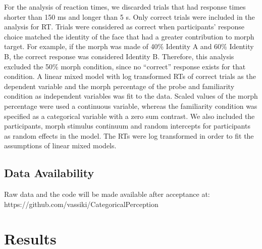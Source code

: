 \documentclass[10pt,letterpaper]{article}
\begin{document}
For the analysis of reaction times, we discarded trials that had response times shorter than 150 ms and longer than 5 s. Only correct trials were included in the analysis for RT. Trials were considered as correct when participants’ response choice matched the identity of the face that had a greater contribution to morph target. For example, if the morph was made of 40\% Identity A and 60\% Identity B, the correct response was considered Identity B. Therefore, this analysis excluded the 50\% morph condition, since no “correct” response exists for that condition. A linear mixed model with log transformed RTs of correct trials as the dependent variable and the morph percentage of the probe and familiarity condition as independent variables was fit to the data. Scaled values of the morph percentage were used a continuous variable, whereas the familiarity condition was specified as a categorical variable with a zero sum contrast. We also included the participants, morph stimulus continuum and random intercepts for participants as random effects in the model. The RTs were log transformed in order to fit the assumptions of linear mixed models. 

\subsection*{Data Availability}
Raw data and the code will be made available after acceptance at: https://github.com/vassiki/CategoricalPerception

\section*{Results}
\end{document}
